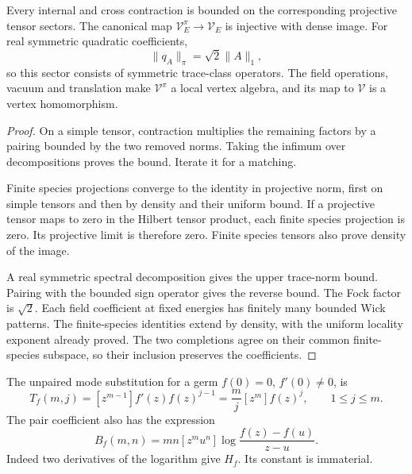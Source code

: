 \begin{proposition}\label{v4-prop:singular-projective-contractions}
Every internal and cross contraction is bounded
on the corresponding projective tensor sectors.
The canonical map \(\mathcal V_E^\pi\to\mathcal V_E\)
is injective with dense image. For real symmetric
quadratic coefficients,
\[
                       \|q_A\|_\pi=\sqrt2\|A\|_1,
\]
so this sector consists of symmetric trace-class
operators. The field operations, vacuum and
translation make \(\mathcal V^\pi\) a local
vertex algebra, and its map to \(\mathcal V\)
is a vertex homomorphism.
\end{proposition}

\begin{proof}
On a simple tensor, contraction multiplies the
remaining factors by a pairing bounded by
the two removed norms. Taking the infimum
over decompositions proves the bound. Iterate
it for a matching.

Finite species projections converge to the
identity in projective norm, first on simple
tensors and then by density and their uniform
bound. If a projective tensor maps to zero
in the Hilbert tensor product, each finite
species projection is zero. Its projective
limit is therefore zero. Finite species
tensors also prove density of the image.

A real symmetric spectral decomposition gives
the upper trace-norm bound. Pairing with the
bounded sign operator gives the reverse bound.
The Fock factor is \(\sqrt2\).
Each field coefficient at fixed energies has
finitely many bounded Wick patterns. The
finite-species identities extend by density,
with the uniform locality exponent already
proved. The two completions agree on their
common finite-species subspace, so their
inclusion preserves the coefficients.
\end{proof}

The unpaired mode substitution for a germ
\(f(0)=0\), \(f'(0)\ne0\), is
\begin{equation}\label{v4-eq:singular-coordinate-jets}
 T_f(m,j)=[z^{m-1}]f'(z)f(z)^{j-1}
             =\frac mj[z^m]f(z)^j,
 \qquad 1\leq j\leq m.
\end{equation}
The pair coefficient also has the expression
\begin{equation}\label{v4-eq:singular-coordinate-pairs}
 B_f(m,n)=mn[z^mu^n]\log\frac{f(z)-f(u)}{z-u}.
\end{equation}
Indeed two derivatives of the logarithm give
\(H_f\). Its constant is immaterial.

